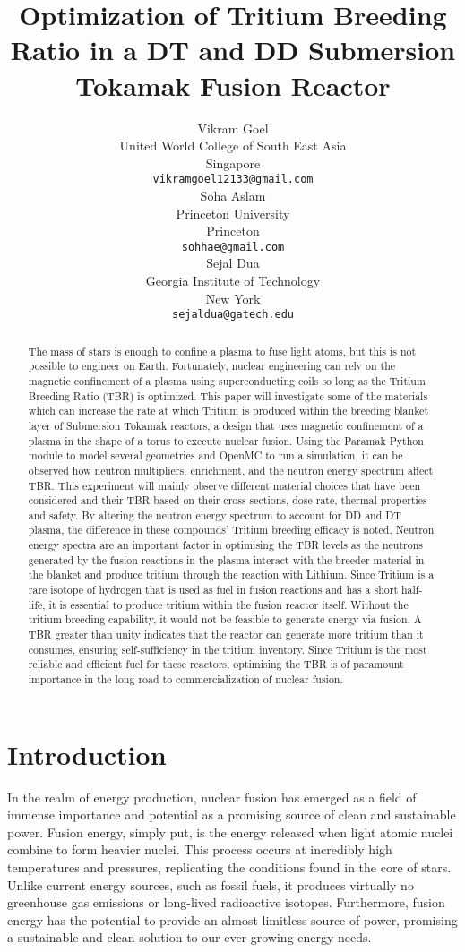 \documentclass{article}
\title{Optimization of Tritium Breeding Ratio in a DT and DD Submersion Tokamak Fusion Reactor
}
\author{
  Vikram Goel \\
  United World College of South East Asia\\
  Singapore\\
  \texttt{vikramgoel12133@gmail.com} \\
   \And
  Soha Aslam \\
  Princeton University \\
  Princeton\\
  \texttt{sohhae@gmail.com} \\
  \And
  Sejal Dua \\
  Georgia Institute of Technology \\
  New York \\
  \texttt{sejaldua@gatech.edu}\\
}
\begin{document}
\maketitle


\begin{abstract}
The mass of stars is enough to confine a plasma to fuse light atoms, but this is not possible to engineer on Earth. Fortunately, nuclear engineering can rely on the magnetic confinement of a plasma using superconducting coils so long as the Tritium Breeding Ratio (TBR) is optimized. This paper will investigate some of the materials which can increase the rate at which Tritium is produced within the breeding blanket layer of Submersion Tokamak reactors, a design that uses magnetic confinement of a plasma in the shape of a torus to execute nuclear fusion. Using the Paramak Python module to model several geometries and OpenMC to run a simulation, it can be observed how neutron multipliers, enrichment, and the neutron energy spectrum affect TBR. This experiment will mainly observe different material choices that have been considered and their TBR based on their cross sections, dose rate, thermal properties and safety. By altering the neutron energy spectrum to account for DD and DT plasma, the difference in these compounds' Tritium breeding efficacy is noted. Neutron energy spectra are an important factor in optimising the TBR levels as the neutrons generated by the fusion reactions in the plasma interact with the breeder material in the blanket and produce tritium through the reaction with Lithium. Since Tritium is a rare isotope of hydrogen that is used as fuel in fusion reactions and has a short half-life, it is essential to produce tritium within the fusion reactor itself. Without the tritium breeding capability, it would not be feasible to generate energy via fusion. A TBR greater than unity indicates that the reactor can generate more tritium than it consumes, ensuring self-sufficiency in the tritium inventory. Since Tritium is the most reliable and efficient fuel for these reactors, optimising the TBR is of paramount importance in the long road to commercialization of nuclear fusion.
\end{abstract}




\section{Introduction}
In the realm of energy production, nuclear fusion has emerged as a field of immense importance and potential as a promising source of clean and sustainable power. Fusion energy, simply put, is the energy released when light atomic nuclei combine to form heavier nuclei. This process occurs at incredibly high temperatures and pressures, replicating the conditions found in the core of stars. Unlike current energy sources, such as fossil fuels, it produces virtually no greenhouse gas emissions or long-lived radioactive isotopes. Furthermore, fusion energy has the potential to provide an almost limitless source of power, promising a sustainable and clean solution to our ever-growing energy needs.
\end{document}
